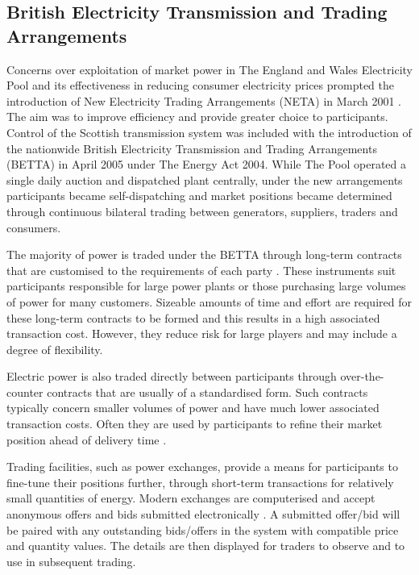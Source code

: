 \subsection{British Electricity Transmission and Trading Arrangements}
\label{sec:betta}
Concerns over exploitation of market power in The England and Wales Electricity
Pool and its effectiveness in reducing consumer electricity prices prompted the
introduction of New Electricity Trading Arrangements (NETA) in March 2001
\cite{martoccia:2005}.  The aim was to improve efficiency and provide greater
choice to participants.  Control of the Scottish transmission system was
included with the introduction of the nationwide British Electricity
Transmission and Trading Arrangements (BETTA) in April 2005 under The Energy
Act 2004.  While The Pool operated a single daily auction and dispatched plant
centrally, under the new arrangements participants became self-dispatching and
market positions became determined through continuous bilateral trading
between generators, suppliers, traders and consumers.

The majority of power is traded under the BETTA through long-term contracts
that are customised to the requirements of each party \cite{kirschen:book}.
These instruments suit participants responsible for large power plants or those
purchasing large volumes of power for many customers.  Sizeable amounts of time and
effort are required for these long-term contracts to be formed and this results
in a high associated transaction cost.  However, they reduce risk for large
players and may include a degree of flexibility.

Electric power is also traded directly between participants through
over-the-counter contracts that are usually of a standardised form.  Such contracts
typically concern smaller volumes of power and have much lower associated
transaction costs.  Often they are used by participants to refine their market
position ahead of delivery time \cite{kirschen:book}.

Trading facilities, such as power exchanges, provide a means for participants
to fine-tune their positions further, through short-term transactions for
relatively small quantities of energy.  Modern exchanges are computerised and
accept anonymous offers and bids submitted electronically \cite{kirschen:book}.
A submitted offer/bid will be paired with any outstanding bids/offers in the
system with compatible price and quantity values.  The details are then
displayed for traders to observe and to use in subsequent trading.

